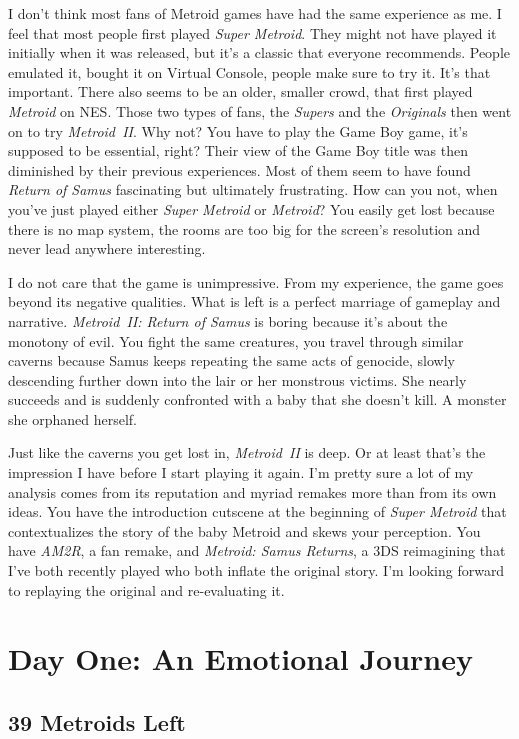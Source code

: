 \documentclass{book}
\begin{document}
I don’t think most fans of Metroid games have had the same experience as me. I feel that most people first played \emph{Super Metroid}. They might not have played it initially when it was released, but it’s a classic that everyone recommends. People emulated it, bought it on Virtual Console, people make sure to try it. It’s that important. There also seems to be an older, smaller crowd, that first played \emph{Metroid} on NES. Those two types of fans, the \emph{Supers} and the \emph{Originals} then went on to try \emph{Metroid~II}. Why not? You have to play the Game Boy game, it’s supposed to be essential, right? Their view of the Game Boy title was then diminished by their previous experiences. Most of them seem to have found \emph{Return of Samus} fascinating but ultimately frustrating. How can you not, when you’ve just played either \emph{Super Metroid} or \emph{Metroid}? You easily get lost because there is no map system, the rooms are too big for the screen’s resolution and never lead anywhere interesting.\par
I do not care that the game is unimpressive. From my experience, the game goes beyond its negative qualities. What is left is a perfect marriage of gameplay and narrative. \emph{Metroid~II: Return of Samus} is boring because it’s about the monotony of evil. You fight the same creatures, you travel through similar caverns because Samus keeps repeating the same acts of genocide, slowly descending further down into the lair or her monstrous victims. She nearly succeeds and is suddenly confronted with a baby that she doesn’t kill. A monster she orphaned herself.\par
Just like the caverns you get lost in, \emph{Metroid~II} is deep. Or at least that’s the impression I have before I start playing it again. I’m pretty sure a lot of my analysis comes from its reputation and myriad remakes more than from its own ideas. You have the introduction cutscene at the beginning of \emph{Super Metroid} that contextualizes the story of the baby Metroid and skews your perception. You have \emph{AM2R}, a fan remake, and \emph{Metroid: Samus Returns}, a 3DS reimagining that I’ve both recently played who both inflate the original story. I’m looking forward to replaying the original and re-evaluating it.\par
\FloatBarrier\section*{Day One: An Emotional Journey}
\FloatBarrier\subsection*{39 Metroids Left}
\end{document}
